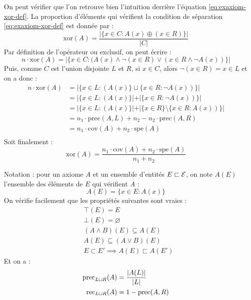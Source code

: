 On peut vérifier que l'on retrouve bien l'intuition derrière l'équation \ref{eq:exaxiom-xor-def}. La proportion d'éléments qui vérifient la condition de séparation \ref{eq:exaxiom-xor-def} est donnée par :
\begin{equation}
    \text{xor}(A) = \frac{| \{x \in C : A(x) \oplus (x \in R) \}|}{| C |}
\end{equation}
Par définition de l'opérateur ou exclusif, on peut écrire :
\begin{equation}
    n \cdot \text{xor}(A) = |\{x \in C: (A(x) \land \neg (x \in R) \lor (x \in R \land \neg A(x)) \}|
\end{equation}
Puis, comme $C$ est l'union disjointe $L$ et $R$, si $x \in C$, alors $\neg (x \in R) = x \in L$ et on a donc :
\begin{align*}
    n \cdot \text{xor}(A) &= |\{x \in L: (A(x)\} \sqcup \{x \in R : \neg A(x)) \}| \\
    &= |\{x \in L: (A(x)\} | + | \{x \in R : \neg A(x)) \}|  \\
    &= |\{x \in L: (A(x)\} | + | \{x \in R \} \setminus \{x \in R : A(x)) \}| \\
    &= n_1 \cdot \text{prec}(A, L) + n_2 - n_2 \cdot \text{prec}(A, R) \\
    &= n_1 \cdot \text{cov}(A) + n_2 \cdot \text{spe}(A) \\
\end{align*}
Soit finalement :
\begin{equation}
    \text{xor}(A) = \frac{n_1 \cdot \text{cov}(A) + n_2 \cdot \text{spe}(A)}{n_1 + n_2}
\end{equation}

Notation : pour un axiome $A$ et un ensemble d'entités $E \sqsubset \mathcal{E}$, on note $A(E)$ l'ensemble des éléments de $E$ qui vérifient $A$ :
$$
A(E) = \{ x \in E : A(x) \}
$$
On vérifie facilement que les propriétés suivantes sont vraies :
\begin{align}
    & \top(E) = E  \\
    & \bot(E) = \varnothing  \\
    & (A \land B)(E) \subseteq A(E) \label{eq:prop-ax-and} \\
    & A(E) \subseteq (A \lor B)(E)  \\
    & E \subset E' \implies A(E) \sqsubset A(E') 
\end{align}
Et on a :
\begin{align}
    \operatorname{prec}_{L \sqcup R}(A) &= \frac{|A(L) |}{|L|} \\
    \operatorname{rec}_{L \sqcup R}(A) &= 1 - \operatorname{prec}(A, R) \\
\end{align}

